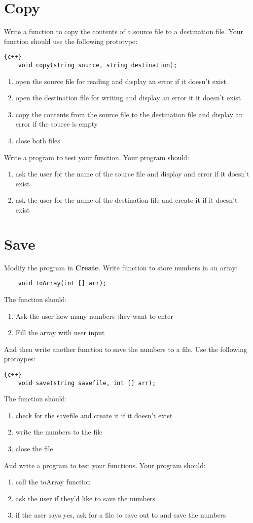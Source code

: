 \documentclass{article}
\begin{document}
\section*{Copy}
Write a function to copy the contents of a source file to a destination file. Your function should use the following prototype:
\begin{lstlisting}{c++}
	void copy(string source, string destination);
\end{lstlisting}
\begin{enumerate}
	\item open the source file for reading and display an error if it doesn't exist
	\item open the destination file for writing and display an error it it doesn't exist
	\item copy the contents from the source file to the destination file and display an error if the source is empty
	\item close both files
\end{enumerate}
Write a program to test your function. Your program should:
\begin{enumerate}
	\item ask the user for the name of the source file and display and error if it doesn't exist
	\item ask the user for the name of the destination file and create it if it doesn't exist
\end{enumerate}
\pagebreak
\section*{Save}
Modify the program in \textbf{Create}. Write function to store numbers in an array:
\begin{lstlisting}
	void toArray(int [] arr);
\end{lstlisting}
The function should:
\begin{enumerate}
	\item Ask the user how many numbers they want to enter
	\item Fill the array with user input
\end{enumerate}

 And then write another function to save the numbers to a file. Use the following protoypes:
\begin{lstlisting}{c++}
	void save(string savefile, int [] arr);
\end{lstlisting}
The function should:
\begin{enumerate}
	\item check for the savefile and create it if it doesn't exist
	\item write the numbers to the file
	\item close the file
\end{enumerate}
And write a program to test your functions. Your program should:
\begin{enumerate}
	\item call the toArray function
	\item ask the user if they'd like to save the numbers
	\item if the user says yes, ask for a file to save out to and save the numbers
\end{enumerate}
\end{document}
